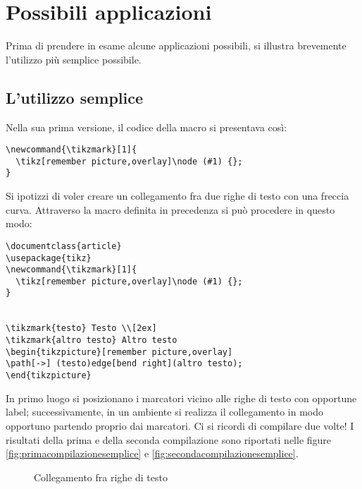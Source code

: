 \chapter{Possibili applicazioni}
\label{chap:applicazioni}
Prima di prendere in esame alcune applicazioni possibili, si illustra brevemente l'utilizzo più semplice possibile.

\section{L'utilizzo semplice}

Nella sua prima versione, il codice della  macro si presentava così:
\begin{lstlisting}[frame=lines]
\newcommand{\tikzmark}[1]{
  \tikz[remember picture,overlay]\node (#1) {};
}
\end{lstlisting}
Si ipotizzi di voler creare un collegamento fra due righe di testo con una freccia curva. Attraverso la  macro definita in precedenza si può procedere in questo modo:
\begin{lstlisting}[frame=lines]
\documentclass{article}
\usepackage{tikz}
\newcommand{\tikzmark}[1]{
  \tikz[remember picture,overlay]\node (#1) {};
}


\tikzmark{testo} Testo \\[2ex]
\tikzmark{altro testo} Altro testo 
\begin{tikzpicture}[remember picture,overlay]
\path[->] (testo)edge[bend right](altro testo);
\end{tikzpicture}

\end{lstlisting}
In primo luogo si posizionano i marcatori vicino alle righe di testo con opportune label; successivamente, in un ambiente  si realizza il collegamento in modo opportuno partendo proprio dai marcatori. Ci si ricordi di compilare due volte! I risultati della prima e della seconda compilazione sono riportati nelle figure \ref{fig:primacompilazionesemplice} e \ref{fig:secondacompilazionesemplice}.

\begin{figure}
\centering
{}\quad\quad
{}
\caption{Collegamento fra righe di testo}
\end{figure}

